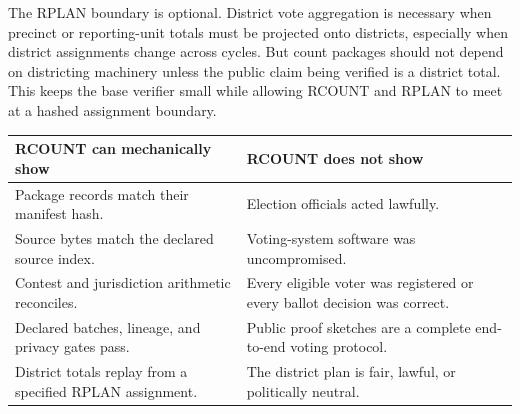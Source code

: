 The RPLAN boundary is optional. District vote aggregation is necessary when
precinct or reporting-unit totals must be projected onto districts, especially
when district assignments change across cycles. But count packages should not
depend on districting machinery unless the public claim being verified is a
district total. This keeps the base verifier small while allowing RCOUNT and
RPLAN to meet at a hashed assignment boundary.

\begin{center}
\small
\begin{tabularx}{\textwidth}{lX}
\toprule
RCOUNT can mechanically show & RCOUNT does not show \\
\midrule
Package records match their manifest hash. & Election officials acted lawfully. \\
Source bytes match the declared source index. & Voting-system software was uncompromised. \\
Contest and jurisdiction arithmetic reconciles. & Every eligible voter was registered or every ballot decision was correct. \\
Declared batches, lineage, and privacy gates pass. & Public proof sketches are a complete end-to-end voting protocol. \\
District totals replay from a specified RPLAN assignment. & The district plan is fair, lawful, or politically neutral. \\
\bottomrule
\end{tabularx}
\end{center}
